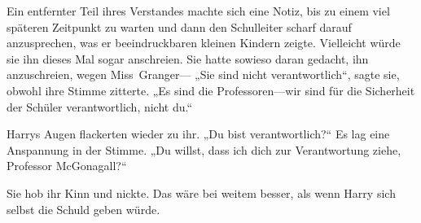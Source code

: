 
Ein entfernter Teil ihres Verstandes machte sich eine Notiz, bis zu einem viel späteren Zeitpunkt zu warten und dann den Schulleiter scharf darauf anzusprechen, was er beeindruckbaren kleinen Kindern zeigte. Vielleicht würde sie ihn dieses Mal sogar anschreien. Sie hatte sowieso daran gedacht, ihn anzuschreien, wegen Miss~Granger—
„Sie sind nicht verantwortlich“, sagte sie, obwohl ihre Stimme zitterte. „Es sind die Professoren—wir sind für die Sicherheit der Schüler verantwortlich, nicht du.“

Harrys Augen flackerten wieder zu ihr. „Du bist verantwortlich?“ Es lag eine Anspannung in der Stimme. „Du willst, dass ich dich zur Verantwortung ziehe, Professor McGonagall?“

Sie hob ihr Kinn und nickte. Das wäre bei weitem besser, als wenn Harry sich selbst die Schuld geben würde.

